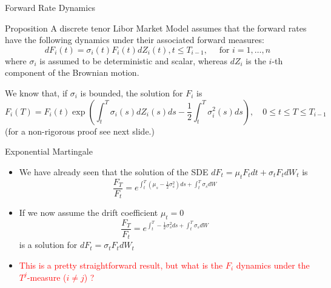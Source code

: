 \documentclass{beamer}
\begin{document}
\begin{frame}{Forward Rate Dynamics}
  \begin{block}{Proposition}
    A discrete tenor Libor Market Model assumes that the forward rates have the following dynamics under their associated forward measures:
    \begin{equation}
      dF_i(t) = \sigma_i(t)F_i(t)dZ_i(t), t \le T_{i-1},\quad\text{ for } i = 1,\ldots, n
      \label{eq:forward_process_lmm}
    \end{equation}
    where $\sigma_i$ is assumed to be deterministic and scalar, whereas $dZ_i$ is the $i$-th component of the Brownian motion.
  \end{block}
\pause
  We know that, if $\sigma_i$ is bounded, the solution for $F_i$ is 
  \begin{equation*}
    F_i(T) = F_i(t) \exp\left(\int_t^T\sigma_i(s)dZ_i(s)ds - \frac{1}{2}\int_t^T 
    \sigma_i^2(s)ds\right),\quad 0\le t \le T \le T_{i-1} 
  \end{equation*}
  (for a non-rigorous proof see next slide.)
\end{frame}

\begin{frame}{Exponential Martingale}
  \begin{itemize}
	  \item<1-> We have already seen that the solution of the SDE $dF_t=\mu_t F_t dt + \sigma_t F_t dW_t$ is
	    \begin{equation*}
		      \frac{F_T}{F_t} = e^{\int_t^T(\mu_s -\frac{1}{2}\sigma_s^2)ds+\int_t^T\sigma_s dW}
		    \end{equation*}
	  \item<2-> If we now assume the drift coefficient $\mu_t=0$ 
	    \begin{equation*}
		    \frac{F_T}{F_t} = e^{\int_t^T-\frac{1}{2}\sigma_s^2 ds+\int_t^T\sigma_s dW}
	    \end{equation*}
	  is a solution for $dF_t=\sigma_t F_tdW_t$
	  \item<3-> \textcolor{red}{This is a pretty straightforward result, but what is the $F_i$ dynamics under the $T^j$-measure ($i\neq j$) ?}
	  \end{itemize}
\end{frame}
\end{document}
